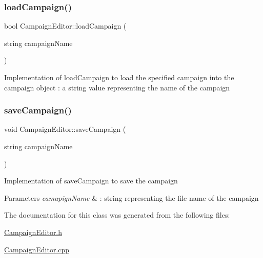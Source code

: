 \subsubsection{\texorpdfstring{load\+Campaign()}{loadCampaign()}}
{\footnotesize\ttfamily bool Campaign\+Editor\+::load\+Campaign (\begin{DoxyParamCaption}\item[{string}]{campaign\+Name }\end{DoxyParamCaption})}

Implementation of load\+Campaign to load the specified campaign into the campaign object  \+: a string value representing the name of the campaign \hypertarget{class_campaign_editor_a22419d5d2e5ef10d667523e9d113b5c2}{}\label{class_campaign_editor_a22419d5d2e5ef10d667523e9d113b5c2} 
\subsubsection{\texorpdfstring{save\+Campaign()}{saveCampaign()}}
{\footnotesize\ttfamily void Campaign\+Editor\+::save\+Campaign (\begin{DoxyParamCaption}\item[{string}]{campaign\+Name }\end{DoxyParamCaption})}

Implementation of save\+Campaign to save the campaign 
\begin{DoxyParams}{Parameters}
{\em camapign\+Name} & \+: string representing the file name of the campaign \\
\hline
\end{DoxyParams}


The documentation for this class was generated from the following files\+:\begin{DoxyCompactItemize}
\item 
\hyperlink{_campaign_editor_8h}{Campaign\+Editor.\+h}\item 
\hyperlink{_campaign_editor_8cpp}{Campaign\+Editor.\+cpp}\end{DoxyCompactItemize}
